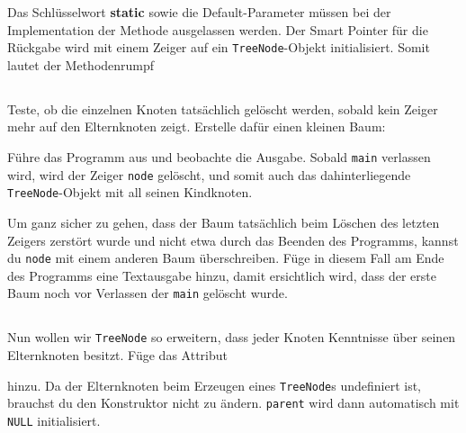 Das Schlüsselwort \textbf{static} sowie die Default-Parameter müssen bei der Implementation der Methode ausgelassen werden.
Der Smart Pointer für die Rückgabe wird mit einem Zeiger auf ein \lstinline{TreeNode}-Objekt initialisiert. Somit lautet der Methodenrumpf



\subsection{}
Teste, ob die einzelnen Knoten tatsächlich gelöscht werden, sobald kein Zeiger mehr auf den Elternknoten zeigt.
Erstelle dafür einen kleinen Baum:


Führe das Programm aus und beobachte die Ausgabe.
Sobald \lstinline{main} verlassen wird, wird der Zeiger \lstinline{node} gelöscht, und somit auch das dahinterliegende \lstinline{TreeNode}-Objekt mit all seinen Kindknoten.

Um ganz sicher zu gehen, dass der Baum tatsächlich beim Löschen des letzten Zeigers zerstört wurde und nicht etwa durch das Beenden des Programms, kannst du \lstinline{node} mit einem anderen Baum überschreiben.
Füge in diesem Fall am Ende des Programms eine Textausgabe hinzu, damit ersichtlich wird, dass der erste Baum noch vor Verlassen der \lstinline{main} gelöscht wurde.

\subsection{}
Nun wollen wir \lstinline{TreeNode} so erweitern, dass jeder Knoten Kenntnisse über seinen Elternknoten besitzt.
Füge das Attribut


hinzu.
Da der Elternknoten beim Erzeugen eines \lstinline{TreeNode}s undefiniert ist, brauchst du den Konstruktor nicht zu ändern. \lstinline{parent} wird dann automatisch mit \lstinline{NULL} initialisiert.

